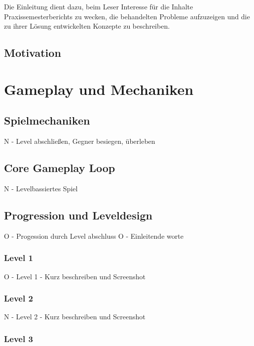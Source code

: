\documentclass[oneside]{ausarbeitung}
\begin{document}
Die Einleitung dient dazu, beim Leser Interesse für die Inhalte 
Praxissemesterberichts zu wecken, die behandelten Probleme aufzuzeigen 
und die zu ihrer Lösung entwickelten Konzepte zu beschreiben.

\section{Motivation}
\label{sec:motivation}

\chapter{Gameplay und Mechaniken}

\section{Spielmechaniken}

N   - Level abschließen, Gegner besiegen, überleben


\section{Core Gameplay Loop}

N   - Levelbassiertes Spiel 


\section{Progression und Leveldesign}

O   - Progession durch Level abschluss
O   - Einleitende worte

\subsection{Level 1}

O  - Level 1
   - Kurz beschreiben und Screenshot


\subsection{Level 2}

N  - Level 2
   - Kurz beschreiben und Screenshot


\subsection{Level 3}
\end{document}
